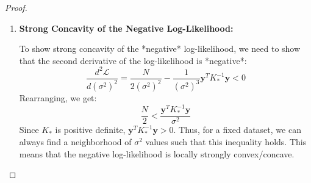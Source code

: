 \begin{proof}
\begin{enumerate}
    \item \textbf{Strong Concavity of the Negative Log-Likelihood:}

    To show strong concavity of the *negative* log-likelihood, we need to show that the second derivative of the log-likelihood is *negative*:
    $$
    \frac{d^2\mathcal{L}}{d(\sigma^2)^2} = \frac{N}{2(\sigma^2)^2} - \frac{1}{(\sigma^2)^3} \mathbf{y}^T K_*^{-1} \mathbf{y} < 0
    $$
    Rearranging, we get:
    $$
    \frac{N}{2} < \frac{\mathbf{y}^T K_*^{-1} \mathbf{y}}{\sigma^2}
    $$
    Since $K_*$ is positive definite, $\mathbf{y}^T K_*^{-1} \mathbf{y} > 0$. Thus, for a fixed dataset, we can always find a neighborhood of $\sigma^2$ values such that this inequality holds. This means that the negative log-likelihood is locally strongly convex/concave.

\end{enumerate}

\end{proof}


